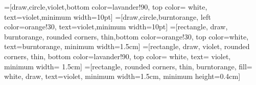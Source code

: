 \documentclass[svgnames]{beamer}
\begin{document}

\def\lav{lavander!90}
\def\oran{orange!30}

=[draw,circle,violet,bottom color=\lav,
                  top color= white, text=violet,minimum width=10pt]
=[draw,circle,burntorange, left color=\oran,
                       text=violet,minimum width=10pt]
=[rectangle, draw, burntorange, rounded corners,
                     thin,bottom color=\oran, top color=white,
                     text=burntorange, minimum width=1.5cm]
=[rectangle, draw, violet, rounded corners, thin,
                     bottom color=\lav, top color= white,
                     text= violet, minimum width= 1.5cm]
=[rectangle, rounded corners, thin,
                           burntorange, fill= white, draw, text=violet,
                           minimum width=1.5cm, minimum height=0.4cm]

\tikzfading[name=arrowfading, top color=transparent!0, bottom color=transparent!95]

\end{document}
